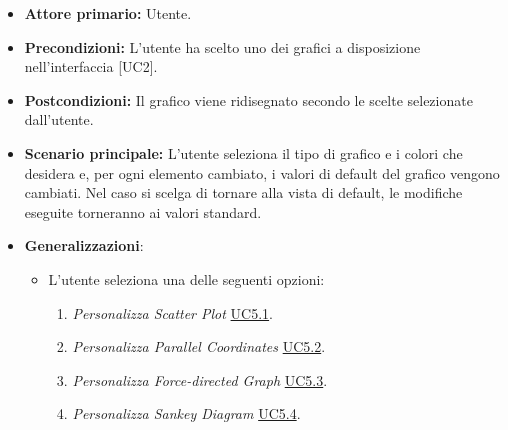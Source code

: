 \begin{itemize}
	\item \textbf{Attore primario:} Utente.
	\item \textbf{Precondizioni:} L'utente ha scelto uno dei grafici a disposizione nell'interfaccia [UC2].
	\item \textbf{Postcondizioni:} Il grafico viene ridisegnato secondo le scelte selezionate dall'utente.
	\item \textbf{Scenario principale:}
    L'utente seleziona il tipo di grafico e i colori che desidera e, per ogni elemento cambiato, i valori di default del grafico
    vengono cambiati. Nel caso si scelga di tornare alla vista di default, le modifiche eseguite torneranno ai valori standard.
    \item \textbf{Generalizzazioni}:
    \begin{itemize}
        \item L'utente seleziona una delle seguenti opzioni:
                \begin{enumerate}
                    \item \textit{Personalizza Scatter Plot} \hyperref[sec:UC5.1]{UC5.1}.
                    \item \textit{Personalizza Parallel Coordinates} \hyperref[sec:UC5.2]{UC5.2}.
                    \item \textit{Personalizza Force-directed Graph} \hyperref[sec:UC5.3]{UC5.3}.
                    \item \textit{Personalizza Sankey Diagram} \hyperref[sec:UC5.4]{UC5.4}.
                \end{enumerate}
    \end{itemize} 
\end{itemize}

\newpage
